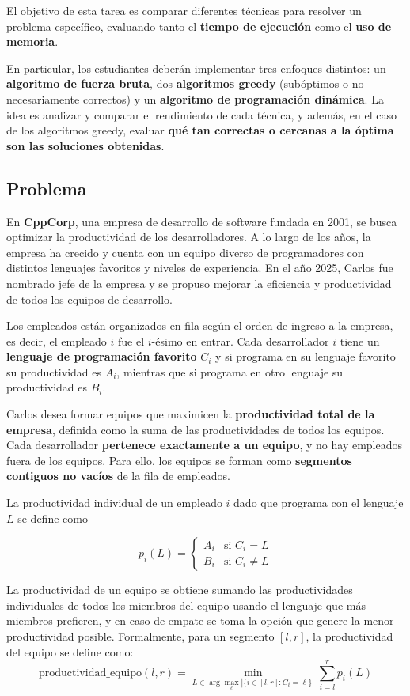 El objetivo de esta tarea \tnum es comparar diferentes técnicas para resolver un problema específico, evaluando tanto el \textbf{tiempo de ejecución} como el \textbf{uso de memoria}. 

En particular, los estudiantes deberán implementar tres enfoques distintos: un \textbf{algoritmo de fuerza bruta}, dos \textbf{algoritmos greedy} (subóptimos o no necesariamente correctos) y un \textbf{algoritmo de programación dinámica}. La idea es analizar y comparar el rendimiento de cada técnica, y además, en el caso de los algoritmos greedy, evaluar \textbf{qué tan correctas o cercanas a la óptima son las soluciones obtenidas}.

\subsection{Problema}

En \textbf{CppCorp}, una empresa de desarrollo de software fundada en 2001, se busca optimizar la productividad de los desarrolladores. A lo largo de los años, la empresa ha crecido y cuenta con un equipo diverso de programadores con distintos lenguajes favoritos y niveles de experiencia. En el año 2025, Carlos fue nombrado jefe de la empresa y se propuso mejorar la eficiencia y productividad de todos los equipos de desarrollo.

Los empleados están organizados en fila según el orden de ingreso a la empresa, es decir, el empleado $i$ fue el $i$-ésimo en entrar. Cada desarrollador $i$ tiene un \textbf{lenguaje de programación favorito} $C_i$ y si programa en su lenguaje favorito su productividad es $A_i$, mientras que si programa en otro lenguaje su productividad es $B_i$.

Carlos desea formar equipos que maximicen la \textbf{productividad total de la empresa}, definida como la suma de las productividades de todos los equipos. Cada desarrollador \textbf{pertenece exactamente a un equipo}, y no hay empleados fuera de los equipos. Para ello, los equipos se forman como \textbf{segmentos contiguos no vacíos} de la fila de empleados.

La productividad individual de un empleado $i$ dado que programa con el lenguaje $L$ se define como

\[
p_i(L) =
\begin{cases}
A_i & \text{si } C_i = L \\
B_i & \text{si } C_i \neq L
\end{cases}
\]

La productividad de un equipo se obtiene sumando las productividades individuales de todos los miembros del equipo usando el lenguaje que más miembros prefieren, y en caso de empate se toma la opción que genere la menor productividad posible. Formalmente, para un segmento $[l,r]$, la productividad del equipo se define como:
\[
\text{productividad\_equipo}(l,r) = \min_{L \in \arg\max_\ell |\{ i \in [l,r] : C_i = \ell \}|} \sum_{i=l}^{r} p_i(L)
\]

